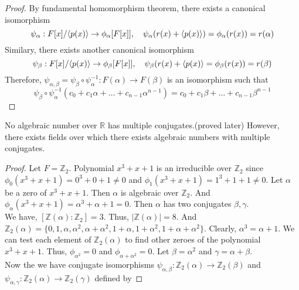 \begin{proof}
	By fundamental homomorphism theorem, there exists a canonical isomorphism 
	\[ \psi_\alpha : F[x]/\langle p(x)\rangle \to \phi_\alpha[F[x]],\quad \psi_\alpha(r(x) + \langle p(x)\rangle) = \phi_\alpha(r(x)) = r(\alpha) \]
	Similary, there exists another canonical isomorphism
	\[ \psi_\beta : F[x]/\langle p(x)\rangle \to \phi_\beta[F[x]],\quad \psi_\beta(r(x) + \langle p(x)\rangle = \phi_\beta(r(x)) = r(\beta) \]
	Therefore, $\psi_{\alpha,\beta} = \psi_\beta \circ \psi_\alpha^{-1} : F(\alpha) \to F(\beta)$ is an isomorphism such that
	\[ \psi_\beta \circ \psi_\alpha^{-1} (c_0 + c_1 \alpha + \dots +c_{n-1}\alpha^{n-1}) = c_0 + c_1 \beta + \dots + c_{n-1} \beta^{n-1} \]
\end{proof}

\begin{commentary}
\begin{challenge}
	No algebraic number over $\mathbb{R}$ has multiple conjugates.(proved later)
	However, there exists fields over which there exists algebraic numbers with multiple conjugates.
\end{challenge}
\begin{proof}
	Let $F = \mathbb{Z}_2$.
	Polynomial $x^3+x+1$ is an irreducible over $\mathbb{Z}_2$ since $\phi_0(x^3+x+1) = 0^3+0+1 \ne 0$ and $\phi_1(x^3+x+1) = 1^3+1+1 \ne 0$.
	Let $\alpha$ be a zero of $x^3+x+1$.
	Then $\alpha$ is algebraic over $\mathbb{Z}_2$.
	And $\phi_\alpha(x^3+x+1) = \alpha^3+\alpha+1 = 0$.
	Then $\alpha$ has two conjugates $\beta,\gamma$.\\

	We have, $[\mathbb{Z}(\alpha):\mathbb{Z}_2] = 3$.
	Thus, $|\mathbb{Z}(\alpha)| = 8$.
	And $\mathbb{Z}_2(\alpha) = \{ 0,1,\alpha,\alpha^2,\alpha+\alpha^2,1+\alpha,1+\alpha^2,1+\alpha+\alpha^2 \}$.
	Clearly, $\alpha^3 = \alpha+1$.
	We can test each element of $\mathbb{Z}_2(\alpha)$ to find other zeroes of the polynomial $x^3+x+1$.
	Thus, $\phi_{\alpha^2} = 0$ and $\phi_{\alpha+\alpha^2} = 0$.
	Let $\beta = \alpha^2$ and $\gamma = \alpha+\beta$.\\

	Now the we have conjugate isomorphisms $\psi_{\alpha,\beta} : \mathbb{Z}_2(\alpha) \to \mathbb{Z}_2(\beta)$ and $\psi_{\alpha,\gamma} : \mathbb{Z}_2(\alpha) \to \mathbb{Z}_2(\gamma)$ defined by


\end{proof}
\end{commentary}
